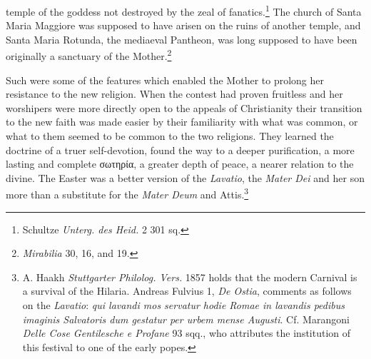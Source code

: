 \documentclass[a4paper, 11pt, oneside, polutonikogreek, english]{article}
\begin{document}
temple of the goddess not destroyed by the zeal of fanatics.\footnote{Schultze \emph{Unterg. des Heid.} 2 301 sq.} The church of Santa Maria Maggiore was supposed to have arisen on the ruins of another temple, and Santa Maria Rotunda, the mediaeval Pantheon, was long supposed to have been originally a sanctuary of the Mother.\footnote{\emph{Mirabilia} 30, 16, and 19.}

Such were some of the features which enabled the Mother to prolong her resistance to the new religion. When the contest had proven fruitless and her worshipers were more directly open to the appeals of Christianity their transition to the new faith was made easier by their familiarity with what was common, or what to them seemed to be common to the two religions. They learned the doctrine of a truer self-devotion, found the way to a deeper purification, a more lasting and complete σωτηρία, a greater depth of peace, a nearer relation to the divine. The Easter was a better version of the \emph{Lavatio}, the \emph{Mater Dei} and her son more than a substitute for the \emph{Mater Deum} and Attis.\footnote{A. Haakh \emph{Stuttgarter Philolog. Vers.} 1857 holds that the modern Carnival is a survival of the Hilaria. Andreas Fulvius 1, \emph{De Ostia}, comments as follows on the \emph{Lavatio}: \emph{qui lavandi mos servatur hodie Romae in lavandis pedibus imaginis Salvatoris dum gestatur per urbem mense Augusti}. Cf. Marangoni \emph{Delle Cose Gentilesche e Profane} 93 sqq., who attributes the institution of this festival to one of the early popes.}
\clearpage
\end{document}
